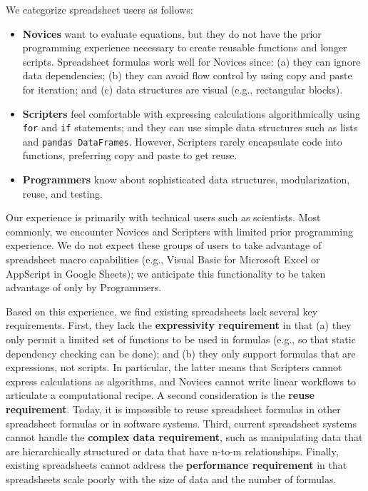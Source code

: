 \documentclass[letterpaper,compsoc,twoside]{IEEEtran}
\begin{document}
We categorize
spreadsheet users as follows:%
\begin{itemize}

\item 

\textbf{Novices} want to evaluate equations, but they do not have the prior
programming experience necessary to create reusable functions and longer scripts.
Spreadsheet formulas work well for Novices since: (a) they can
ignore data dependencies;
(b) they can avoid flow control by using
\textquotedbl{}copy\textquotedbl{} and \textquotedbl{}paste\textquotedbl{} for iteration;
and (c) data structures are \textquotedbl{}visual\textquotedbl{} (e.g., rectangular blocks).
\item 

\textbf{Scripters} feel comfortable with expressing calculations algorithmically using \texttt{for} and \texttt{if}
statements; and they can use simple data structures such as lists and
\texttt{pandas DataFrames}.
However, Scripters rarely encapsulate code into functions,
preferring \textquotedbl{}copy\textquotedbl{} and \textquotedbl{}paste\textquotedbl{} to get reuse.
\item 

\textbf{Programmers} know about sophisticated data structures, modularization, reuse, and testing.
\end{itemize}


Our experience is primarily with technical users such as scientists.
Most commonly, we encounter Novices and Scripters with limited prior programming
experience. We do not expect these groups of users to take advantage of
spreadsheet macro capabilities (e.g.,  Visual Basic for Microsoft Excel or
AppScript in Google Sheets); we anticipate this functionality to be taken advantage
of only by Programmers.

Based on this experience, we find
existing spreadsheets lack several key requirements.
First, they lack
the \textbf{expressivity requirement} in that (a)
they only permit a limited set of functions to be used
in formulas (e.g., so that static dependency
checking can be done); and (b)
they only support formulas that are expressions,
not scripts.
In particular, the latter means that Scripters
cannot express calculations as algorithms, and
Novices
cannot write linear workflows to
articulate a computational recipe.
A second consideration is the
\textbf{reuse requirement}.
Today,
it is impossible to reuse spreadsheet
formulas in other spreadsheet formulas or in software systems.
Third, current spreadsheet systems cannot handle the
\textbf{complex data requirement}, such as
manipulating data that are
hierarchically structured or data that have n-to-m relationships.
Finally, existing spreadsheets cannot address the
\textbf{performance requirement} in that
spreadsheets scale poorly with
the size of data and the number of formulas.
\end{document}
